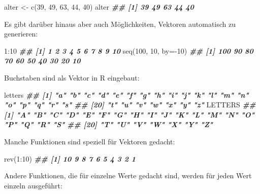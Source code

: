 \documentclass[
  ngerman,
]{article}
\newenvironment{Shaded}{\begin{snugshade}}{\end{snugshade}}
\newcommand{\AttributeTok}[1]{\textcolor[rgb]{0.77,0.63,0.00}{#1}}
\newcommand{\DecValTok}[1]{\textcolor[rgb]{0.00,0.00,0.81}{#1}}
\newcommand{\DocumentationTok}[1]{\textcolor[rgb]{0.56,0.35,0.01}{\textbf{\textit{#1}}}}
\newcommand{\FunctionTok}[1]{\textcolor[rgb]{0.00,0.00,0.00}{#1}}
\newcommand{\NormalTok}[1]{#1}
\newcommand{\OtherTok}[1]{\textcolor[rgb]{0.56,0.35,0.01}{#1}}
\newcommand{\SpecialCharTok}[1]{\textcolor[rgb]{0.00,0.00,0.00}{#1}}
\begin{document}
\begin{Shaded}
\begin{Highlighting}[]
\NormalTok{alter }\OtherTok{\textless{}{-}} \FunctionTok{c}\NormalTok{(}\DecValTok{39}\NormalTok{, }\DecValTok{49}\NormalTok{, }\DecValTok{63}\NormalTok{, }\DecValTok{44}\NormalTok{, }\DecValTok{40}\NormalTok{)}
\NormalTok{alter}
\DocumentationTok{\#\# [1] 39 49 63 44 40}
\end{Highlighting}
\end{Shaded}

Es gibt darüber hinaus aber auch Möglichkeiten, Vektoren automatisch zu generieren:

\begin{Shaded}
\begin{Highlighting}[]
\DecValTok{1}\SpecialCharTok{:}\DecValTok{10}
\DocumentationTok{\#\#  [1]  1  2  3  4  5  6  7  8  9 10}
\FunctionTok{seq}\NormalTok{(}\DecValTok{100}\NormalTok{, }\DecValTok{10}\NormalTok{, }\AttributeTok{by=}\SpecialCharTok{{-}}\DecValTok{10}\NormalTok{)}
\DocumentationTok{\#\#  [1] 100  90  80  70  60  50  40  30  20  10}
\end{Highlighting}
\end{Shaded}

Buchstaben sind als Vektor in R eingebaut:

\begin{Shaded}
\begin{Highlighting}[]
\NormalTok{letters}
\DocumentationTok{\#\#  [1] "a" "b" "c" "d" "e" "f" "g" "h" "i" "j" "k" "l" "m" "n" "o" "p" "q" "r" "s"}
\DocumentationTok{\#\# [20] "t" "u" "v" "w" "x" "y" "z"}
\NormalTok{LETTERS}
\DocumentationTok{\#\#  [1] "A" "B" "C" "D" "E" "F" "G" "H" "I" "J" "K" "L" "M" "N" "O" "P" "Q" "R" "S"}
\DocumentationTok{\#\# [20] "T" "U" "V" "W" "X" "Y" "Z"}
\end{Highlighting}
\end{Shaded}

Manche Funktionen sind speziell für Vektoren gedacht:

\begin{Shaded}
\begin{Highlighting}[]
\FunctionTok{rev}\NormalTok{(}\DecValTok{1}\SpecialCharTok{:}\DecValTok{10}\NormalTok{)}
\DocumentationTok{\#\#  [1] 10  9  8  7  6  5  4  3  2  1}
\end{Highlighting}
\end{Shaded}

Andere Funktionen, die für einzelne Werte gedacht sind, werden für jeden Wert einzeln ausgeführt:
\end{document}
